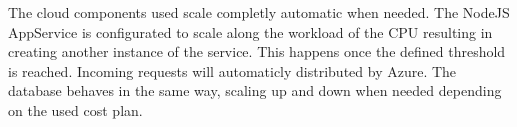 The cloud components used scale completly automatic when needed. The NodeJS AppService is configurated to scale along the workload of the CPU resulting in creating another instance of the service. This happens once the defined threshold is reached. Incoming requests will automaticly distributed by Azure. The database behaves in the same way, scaling up and down when needed depending on the used cost plan.